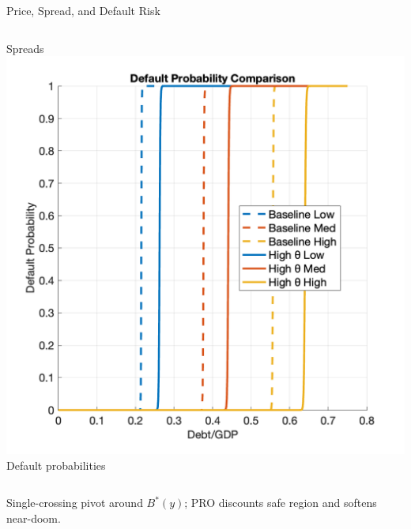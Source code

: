 \documentclass[aspectratio=169,11pt,professionalfonts]{beamer}
\newcommand{\1}{\mathbb{1}}
\begin{document}
\begin{frame}{Price, Spread, and Default Risk}
\begin{columns}[T,onlytextwidth]
    {\scriptsize Spreads}
    \includegraphics[width=\linewidth]{default_prob_comparison.png}\\[0.3em]
    {\scriptsize Default probabilities}
  \end{columns}
  \vspace{0.3em}
  {\scriptsize Single-crossing pivot around $B^*(y)$; PRO discounts safe region and softens near-doom.}
\end{frame}
\end{document}
